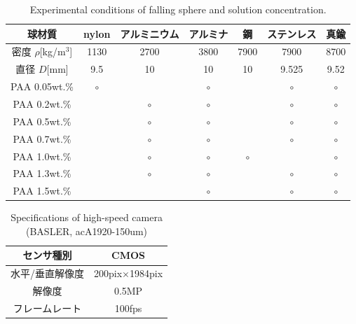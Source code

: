 \begin{table}[h]
    \centering
    \caption{Experimental conditions of falling sphere and solution concentration.}
    \label{table:exp-conditions}
    \begin{tabular}{c|c|c|c|c|c|c}\hline
        球材質                & nylon   & アルミニウム & アルミナ & 鋼      & ステンレス & 真鍮    \\ \hline
        密度 $\rho$[kg/m$^3$] & 1130    & 2700         & 3800     & 7900    & 7900       & 8700    \\ \hline
        直径 $D$[mm]          & 9.5     & 10           & 10       & 10      & 9.525      & 9.52    \\ \hline \hline
        PAA 0.05wt.\%         & $\circ$ &              & $\circ$  &         & $\circ$    & $\circ$ \\ \hline
        PAA 0.2wt.\%          &         & $\circ$      & $\circ$  &         & $\circ$    & $\circ$ \\ \hline
        PAA 0.5wt.\%          &         & $\circ$      & $\circ$  &         & $\circ$    & $\circ$ \\ \hline
        PAA 0.7wt.\%          &         & $\circ$      & $\circ$  &         & $\circ$    & $\circ$ \\ \hline
        PAA 1.0wt.\%          &         & $\circ$      & $\circ$  & $\circ$ &            & $\circ$ \\ \hline
        PAA 1.3wt.\%          &         & $\circ$      & $\circ$  &         & $\circ$    & $\circ$ \\ \hline
        PAA 1.5wt.\%          &         &              & $\circ$  &         & $\circ$    & $\circ$ \\ \hline
    \end{tabular}
\end{table}

\begin{table}[h]
    \centering
    \caption{Specifications of high-speed camera (BASLER, acA1920-150um)}
    \label{table:camera}
    \begin{tabular}{c|c}\hline
        センサ種別      & CMOS                  \\ \hline
        水平/垂直解像度 & 200pix$\times$1984pix \\ \hline
        解像度          & 0.5MP                 \\ \hline
        フレームレート  & 100fps                \\ \hline
    \end{tabular}
\end{table}
\clearpage

